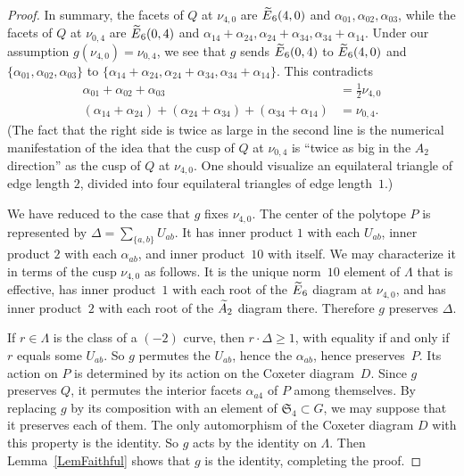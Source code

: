 \documentclass[11pt]{article}
\theoremstyle{definition}
\numberwithin{equation}{section}
\numberwithin{figure}{section}
\numberwithin{table}{section}
\let\oldtilde\tilde
\renewcommand*\tilde[1]{\mathchoice{\widetilde{#1}}{\widetilde{#1}}{\oldtilde{#1}}{\oldtilde{#1}}}
\newcommand*\Atilde{\tilde A}
\newcommand*\Etilde{\tilde E}
\newcommand*\sset{\subset}
\newcommand{\frakS}{\mathfrak{S}}
\begin{document}
\begin{proof}
In summary, the facets of $Q$ at $\nu_{4,0}$ are $\Etilde_6(4,0)$ and $\alpha_{01},\alpha_{02},\alpha_{03}$, while the facets of $Q$ at $\nu_{0,4}$ are $\Etilde_6(0,4)$ and $\alpha_{14}+\alpha_{24},
\alpha_{24}+\alpha_{34}, \alpha_{34}+\alpha_{14}$. Under our assumption $g(\nu_{4,0})=\nu_{0,4}$, we see that $g$ sends $\Etilde_6(0,4)$ to $\Etilde_6(4,0)$ and $\{\alpha_{01},\alpha_{02},\alpha_{03}\}$ to $\{\alpha_{14}+\alpha_{24},
\alpha_{24}+\alpha_{34}, \alpha_{34}+\alpha_{14}\}$. This contradicts
\begin{align*}
\alpha_{01}+\alpha_{02}+\alpha_{03}&=\tfrac12\nu_{4,0}\\
(\alpha_{14}+\alpha_{24})+ (\alpha_{24}+\alpha_{34})+ (\alpha_{34}+\alpha_{14})&=\nu_{0,4}.
\end{align*}
(The fact that the right side is twice as large in the second line is the numerical manifestation of the idea that the cusp of $Q$ at $\nu_{0,4}$ is ``twice as big in the $A_2$ direction'' as the cusp of $Q$ at $\nu_{4,0}$. One should visualize an equilateral triangle of edge length $2$, divided into four equilateral triangles of edge length~$1$.)

We have reduced to the case that $g$ fixes $\nu_{4,0}$. The center of the polytope $P$ is represented by $\Delta= \sum_{\{a,b\}}U_{ab}$. It has inner product $1$ with each $U_{ab}$, inner product $2$ with each $\alpha_{ab}$, and inner product~$10$ with itself. We may characterize it in terms of the cusp $\nu_{4,0}$ as follows. It is the unique norm~$10$ element of $\Lambda$ that is effective, has inner product~$1$ with each root of the $\Etilde_6$ diagram at $\nu_{4,0}$, and has inner product~$2$ with each root of the $\Atilde_2$ diagram there. Therefore $g$ preserves $\Delta$.

If $r\in\Lambda$ is the class of a $(-2)$ curve, then $r\cdot\Delta\geq1$, with equality if and only if $r$ equals some $U_{ab}$. So $g$ permutes the $U_{ab}$, hence the $\alpha_{ab}$, hence preserves~$P$. Its action on $P$ is determined by its action on the Coxeter diagram~$D$. Since $g$ preserves $Q$, it permutes the interior facets $\alpha_{a4}$ of $P$ among themselves. By replacing $g$ by its composition with an element of $\frakS_4\sset G$, we may suppose that it preserves each of them. The only automorphism of the Coxeter diagram $D$ with this property is the identity. So $g$ acts by the identity on $\Lambda$. Then Lemma~\ref{LemFaithful} shows that $g$ is the identity, completing the proof.
\end{proof}
\end{document}
